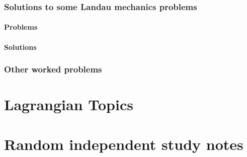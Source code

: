       \section{Solutions to some Landau mechanics problems}
         \subsection{Problems}
            
         \subsection{Solutions}
            \shipoutAnswer
      \section{Other worked problems}
         
            \shipoutAnswer
   
\part{Lagrangian Topics}
   
   
   
   
   
   

\part{Random independent study notes}
   
   
   
   
   
   
   
   
   
   
   
   
   
